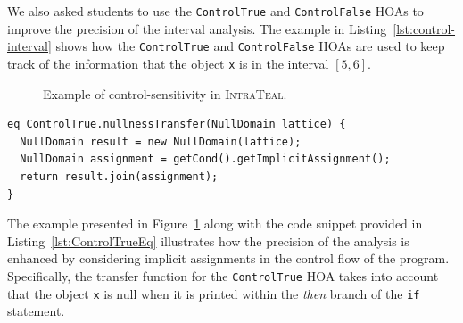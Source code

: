We also asked students to use the \texttt{ControlTrue} and \texttt{ControlFalse}
HOAs to improve the precision of the interval analysis. The example in
Listing~\ref{lst:control-interval} shows how the \texttt{ControlTrue} and \texttt{ControlFalse}
HOAs are used to keep track of the information that the object \texttt{x} is in the interval $[5,6]$.
\begin{figure}
	\centering
	\caption{\label{fig:ExampleTEAL} Example of control-sensitivity in \textsc{IntraTeal}.}
\end{figure}
\begin{lstlisting}[language=JastAdd,label={lst:ControlTrueEq}, caption={Transfer function for \texttt{ControlTrue} HOA.}]
eq ControlTrue.nullnessTransfer(NullDomain lattice) {
  NullDomain result = new NullDomain(lattice);
  NullDomain assignment = getCond().getImplicitAssignment();
  return result.join(assignment);
}
\end{lstlisting}
The example presented in Figure~\ref{fig:ExampleTEAL} along with the code snippet
provided in Listing~\ref{lst:ControlTrueEq} illustrates how the precision of the
analysis is enhanced by considering implicit assignments in the control flow of
the program. Specifically, the transfer function for the \texttt{ControlTrue} HOA
takes into account that the object \texttt{x} is null when it is printed within
the \emph{then} branch of the \texttt{if} statement.


